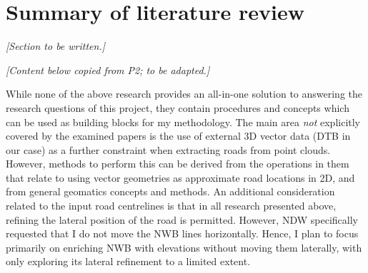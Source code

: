 \section{Summary of literature review}
\label{sec:rwsummary}

\textit{[Section to be written.]}

\textit{[Content below copied from P2; to be adapted.]}

While none of the above research provides an all-in-one solution to answering the research questions of this project, they contain procedures and concepts which can be used as building blocks for my methodology. The main area \textit{not} explicitly covered by the examined papers is the use of external 3D vector data (DTB in our case) as a further constraint when extracting roads from point clouds. However, methods to perform this can be derived from the operations in them that relate to using vector geometries as approximate road locations in 2D, and from general geomatics concepts and methods. An additional consideration related to the input road centrelines is that in all research presented above, refining the lateral position of the road is permitted. However, NDW specifically requested that I do not move the NWB lines horizontally. Hence, I plan to focus primarily on enriching NWB with elevations without moving them laterally, with only exploring its lateral refinement to a limited extent.